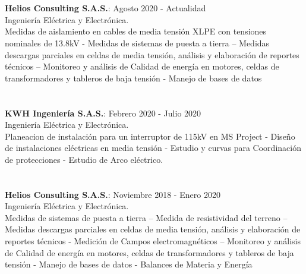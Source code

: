 \documentclass[margin]{res}
\begin{document}
\begin{resume}
\section{\centering}
\hfill \break
\textbf{Helios Consulting S.A.S.}: \hfill Agosto 2020 - Actualidad
\\Ingeniería Eléctrica y Electrónica.
\\Medidas de aislamiento en cables de media tensión XLPE con tensiones nominales de 13.8kV - Medidas de sistemas de puesta a tierra – Medidas descargas parciales en celdas de media tensión, análisis y elaboración de reportes técnicos – Monitoreo y análisis de Calidad de energía en motores, celdas de transformadores y tableros de baja tensión - Manejo de bases de datos

\section{\centering}
\hfill \break
\textbf{KWH Ingeniería S.A.S.}: \hfill Febrero 2020 - Julio 2020
\\Ingeniería Eléctrica y Electrónica.
\\Planeacion de instalación para un interruptor de 115kV en MS Project - Diseño de instalaciones eléctricas en media tensión - Estudio y curvas para Coordinación de protecciones - Estudio de Arco eléctrico. 

\section{\centering}
\hfill \break
\textbf{Helios Consulting S.A.S.}: \hfill Noviembre 2018 - Enero 2020
\\Ingeniería Eléctrica y Electrónica.
\\Medidas de sistemas de puesta a tierra – Medida de resistividad del terreno – Medidas descargas parciales en celdas de media tensión, análisis y elaboración de reportes técnicos - Medición de Campos electromagnéticos – Monitoreo y análisis de Calidad de energía en motores, celdas de transformadores y tableros de baja tensión - Manejo de bases de datos - Balances de Materia y Energía 


\end{resume}
\end{document}
